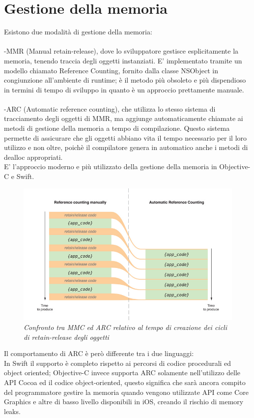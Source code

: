 \section{Gestione della memoria}
Esistono due modalità di gestione della memoria:\\
\\-MMR (Manual retain-release), dove lo sviluppatore gestisce esplicitamente la memoria, tenendo traccia degli oggetti instanziati. E' implementato tramite un modello chiamato Reference Counting, fornito dalla classe NSObject in congiunzione all'ambiente di runtime; è il metodo più obsoleto e più dispendioso in termini di tempo di sviluppo in quanto è un approccio prettamente manuale.\\
\\-ARC (Automatic reference counting), che utilizza lo stesso sistema di tracciamento degli oggetti di MMR, ma aggiunge automaticamente chiamate ai metodi di gestione della memoria a tempo di compilazione. Questo sistema permette di assicurare che gli oggetti abbiano vita il tempo necessario per il loro utilizzo e non oltre, poichè il compilatore genera in automatico anche i metodi di dealloc appropriati.\\E' l'approccio moderno e più utilizzato della gestione della memoria in Objective-C e Swift.
\begin{figure}[H]
      \centering
      \includegraphics[scale=0.40]{immagini/ARC.jpg}
            \vspace{0.8cm}
            \caption{\textit{Confronto tra MMC ed ARC relativo al tempo di creazione dei cicli di retain-release degli oggetti}}
    \end{figure}
Il comportamento di ARC è però differente tra i due linguaggi:\\
In Swift il supporto è completo rispetto ai percorsi di codice procedurali ed object oriented; Objective-C invece supporta ARC solamente nell'utilizzo delle API Cocoa ed il codice object-oriented, questo significa che sarà ancora compito del programmatore gestire la memoria quando vengono utilizzate API come Core Graphics e altre di basso livello disponibili in iOS, creando il rischio di memory leaks.
